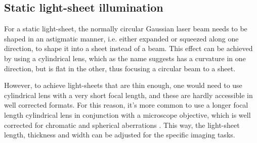 
  \subsection{Static light-sheet illumination}
    For a static light-sheet, the normally circular Gaussian laser beam needs to be shaped in an astigmatic manner, i.e. either expanded or squeezed along one direction, to shape it into a sheet instead of a beam. This effect can be achieved by using a cylindrical lens, which as the name suggests has a curvature in one direction, but is flat in the other, thus focusing a circular beam to a sheet.
    
    However, to achieve light-sheets that are thin enough, one would need to use cylindrical lens with a very short focal length, and these are hardly accessible in well corrected formats. For this reason, it's more common to use a longer focal length cylindrical lens in conjunction with a microscope objective, which is well corrected for chromatic and spherical aberrations \cite{greger_basic_2007}. This way, the light-sheet length, thickness and width can be adjusted for the specific imaging tasks.


